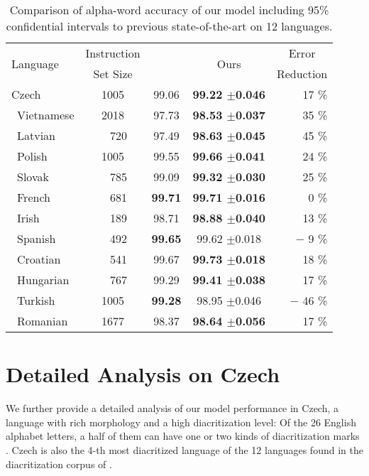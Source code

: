 \documentclass{pbmlarxiv}
\begin{document}
\begin{table}[t]
    \centering
\begin{tabular}{l cccr}\toprule
    \multirow{2}{*}{Language} & Instruction & \multirow{2}{*}{\citet{naplava2018diacritics}} & \multirow{2}{*}{Ours} & \multicolumn{1}{c}{Error} \\
    & Set Size & & & Reduction \\\midrule
Czech   &1005&99.06&\textbf{99.22 $\pm$0.046} & 17 \% \\\
Vietnamese  &2018&97.73&\textbf{98.53 $\pm$0.037} & 35 \%	\\\
Latvian &~~720&97.49&\textbf{98.63 $\pm$0.045} & 45 \% \\\
Polish  &1005&99.55&\textbf{99.66 $\pm$0.041} & 24 \%\\\
Slovak  &~~785&99.09&\textbf{99.32 $\pm$0.030} & 25 \%\\\
French  &~~681&\textbf{99.71}&\textbf{99.71 $\pm$0.016} & 0 \%\\\
Irish   &~~189&98.71&\textbf{98.88 $\pm$0.040} & 13 \% \\\
Spanish   &~~492&\textbf{99.65}&99.62 $\pm$0.018 & $-$ 9 \%\\\
Croatian    &~~541&99.67&\textbf{99.73 $\pm$0.018} & 18 \%\\\
Hungarian   &~~767&99.29&\textbf{99.41 $\pm$0.038} & 17 \%\\\
Turkish &1005&\textbf{99.28}&98.95 $\pm$0.046 & $-$ 46 \% \\\
Romanian    &1677&98.37&\textbf{98.64 $\pm$0.056} & 17 \% \\\bottomrule
\end{tabular}
    \caption{Comparison of alpha-word accuracy of our model including 95\% confidential intervals to previous state-of-the-art on 12 languages.}
    \label{table:inter_language_results}
\end{table}


\section{Detailed Analysis on Czech}

We further provide a detailed analysis of our model performance in Czech, a language with rich morphology and a high diacritization level: Of the 26 English alphabet letters, a half of them can have one or two kinds of diacritization marks \cite{NovyEncyklopedickySlovnik}. Czech is also the 4-th most diacritized language of the 12 languages found in the diacritization corpus of \citet{naplava2018diacritics}. 
\end{document}
